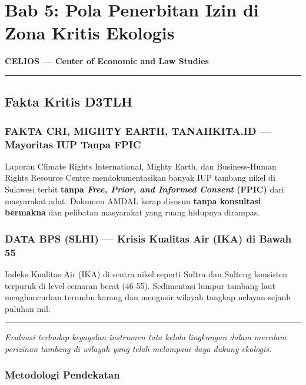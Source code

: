 \documentclass[
]{article}
\author{}
\date{}
\begin{document}
\section{Bab 5: Pola Penerbitan Izin di Zona Kritis
Ekologis}\label{bab-5-pola-penerbitan-izin-di-zona-kritis-ekologis}

\textbf{CELIOS --- Center of Economic and Law Studies}

\begin{center}\rule{0.5\linewidth}{0.5pt}\end{center}

\subsection{Fakta Kritis D3TLH}\label{fakta-kritis-d3tlh}

\subsubsection{FAKTA CRI, MIGHTY EARTH, TANAHKITA.ID --- Mayoritas IUP
Tanpa
FPIC}\label{fakta-cri-mighty-earth-tanahkita.id-mayoritas-iup-tanpa-fpic}

Laporan Climate Rights International, Mighty Earth, dan Business-Human
Rights Resource Centre mendokumentasikan banyak IUP tambang nikel di
Sulawesi terbit \textbf{tanpa \emph{Free, Prior, and Informed Consent}
(FPIC)} dari masyarakat adat. Dokumen AMDAL kerap disusun \textbf{tanpa
konsultasi bermakna} dan pelibatan masyarakat yang ruang hidupnya
dirampas.

\subsubsection{DATA BPS (SLHI) --- Krisis Kualitas Air (IKA) di Bawah
55}\label{data-bps-slhi-krisis-kualitas-air-ika-di-bawah-55}

Indeks Kualitas Air (IKA) di sentra nikel seperti Sultra dan Sulteng
konsisten terpuruk di level cemaran berat (46-55). Sedimentasi lumpur
tambang laut menghancurkan terumbu karang dan mengusir wilayah tangkap
nelayan sejauh puluhan mil.

\begin{center}\rule{0.5\linewidth}{0.5pt}\end{center}

\emph{Evaluasi terhadap kegagalan instrumen tata kelola lingkungan dalam
meredam perizinan tambang di wilayah yang telah melampaui daya dukung
ekologis.}

\subsubsection{Metodologi Pendekatan}\label{metodologi-pendekatan}
\end{document}
